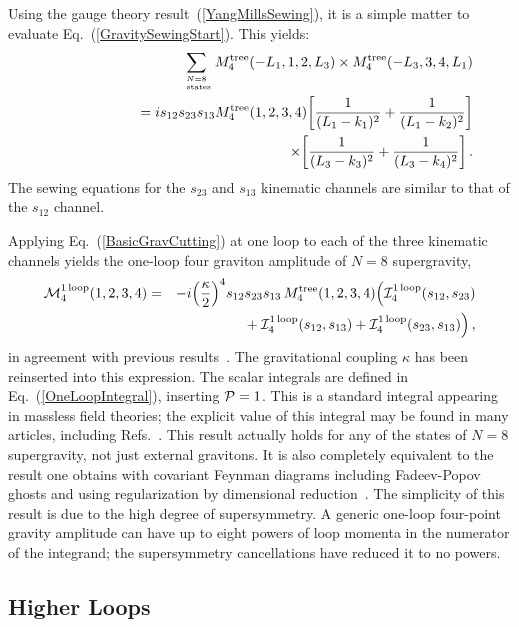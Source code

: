 \documentclass[12pt]{livrev}
\begin{document}
Using the gauge theory result~(\ref{YangMillsSewing}), it is a simple
matter to evaluate Eq.~(\ref{GravitySewingStart}). This yields:
%
\begin{eqnarray}
&& \sum_{N=8 \atop \rm\ states}  M_4^{\rm tree}(-L_1, 1, 2, L_3) \times
  M_4^{\rm tree}(-L_3, 3, 4, L_1) \nonumber \\
&& \hskip 2 cm 
= i s_{12} s_{23} s_{13} M_4^{\rm tree}(1, 2, 3, 4)
 \biggl[{1\over (L_1 - k_1)^2 } + {1\over (L_1 - k_2)^2} \biggr] \nonumber \\
&& \hskip 5.03 cm \times
\biggl[{1\over (L_3 - k_3)^2 } + {1\over (L_3 - k_4)^2} \biggr]\,.
\label{BasicGravCutting}
\end{eqnarray}
%
The sewing equations for the $s_{23}$ and $s_{13}$ kinematic channels are
similar to that of the $s_{12}$ channel.

Applying Eq.~(\ref{BasicGravCutting}) at one loop to each of the three
kinematic channels yields the one-loop four graviton amplitude of $N=8$
supergravity,
%
\begin{eqnarray}
 {\cal M}_4^{{\rm 1\, loop}}(1, 2, 3, 4)
& = &  -i \Bigl( {\kappa \over 2}\Bigr)^4 
 s_{12} s_{23} s_{13}\,  M_4^{\rm tree}(1,2,3,4)  
 \Bigl(  {\cal I}_4^{{\rm 1\, loop}}(s_{12},s_{23}) \nonumber\\
&& \hskip 1.3 cm  
       \null    + {\cal I}_4^{{\rm 1\, loop}}(s_{12},s_{13})  
           + {\cal I}_4^{{\rm 1\, loop}}(s_{23},s_{13})  \Bigr) \,,
\end{eqnarray}
%
in agreement with previous results~\cite{GSB}.  The gravitational
 coupling $\kappa$ has been reinserted into this expression.  The
 scalar integrals are defined in Eq.~(\ref{OneLoopIntegral}),
 inserting ${\cal P} = 1$.  This is a standard integral appearing in
 massless field theories; the explicit value of this integral may be
 found in many articles, including Refs.~\cite{GSB,Long}.  This result
 actually holds for any of the states of $N=8$ supergravity, not just
 external gravitons.  It is also completely equivalent to the
 result one obtains with covariant Feynman diagrams including
 Fadeev-Popov~\cite{Faddeev} ghosts and using regularization by
 dimensional reduction~\cite{Siegel79DR}.  The simplicity of this
 result is due to the high degree of supersymmetry.  A generic
 one-loop four-point gravity amplitude can have up to eight powers of
 loop momenta in the numerator of the integrand; the supersymmetry
 cancellations have reduced it to no powers.

\subsection{Higher Loops}
\end{document}
